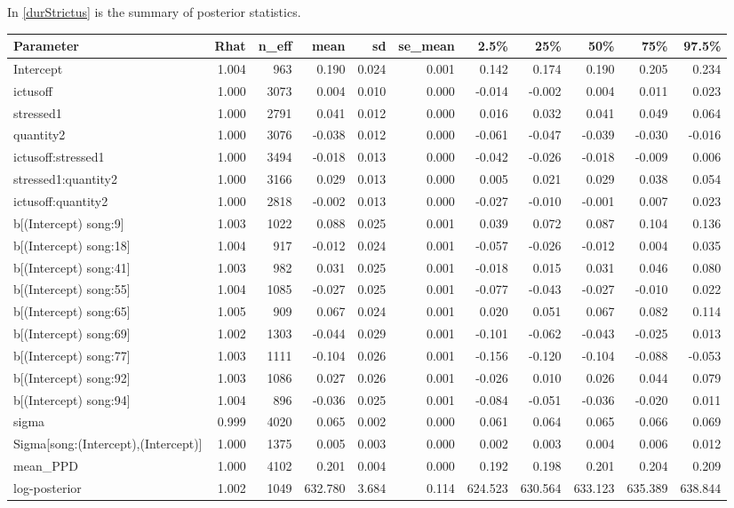 In \ref{durStrictus} is the summary of posterior statistics. 
\begin{longtable}{lrrrrrrrrrr}
  \toprule
Parameter & Rhat & n\_eff & mean & sd & se\_mean & 2.5\% & 25\% & 50\% & 75\% & 97.5\% \\ 
  \midrule
Intercept & 1.004 &  963 & 0.190 & 0.024 & 0.001 & 0.142 & 0.174 & 0.190 & 0.205 & 0.234 \\ 
  ictusoff & 1.000 & 3073 & 0.004 & 0.010 & 0.000 & -0.014 & -0.002 & 0.004 & 0.011 & 0.023 \\ 
  stressed1 & 1.000 & 2791 & 0.041 & 0.012 & 0.000 & 0.016 & 0.032 & 0.041 & 0.049 & 0.064 \\ 
  quantity2 & 1.000 & 3076 & -0.038 & 0.012 & 0.000 & -0.061 & -0.047 & -0.039 & -0.030 & -0.016 \\ 
  ictusoff:stressed1 & 1.000 & 3494 & -0.018 & 0.013 & 0.000 & -0.042 & -0.026 & -0.018 & -0.009 & 0.006 \\ 
  stressed1:quantity2 & 1.000 & 3166 & 0.029 & 0.013 & 0.000 & 0.005 & 0.021 & 0.029 & 0.038 & 0.054 \\ 
  ictusoff:quantity2 & 1.000 & 2818 & -0.002 & 0.013 & 0.000 & -0.027 & -0.010 & -0.001 & 0.007 & 0.023 \\ 
  b[(Intercept) song:9] & 1.003 & 1022 & 0.088 & 0.025 & 0.001 & 0.039 & 0.072 & 0.087 & 0.104 & 0.136 \\ 
  b[(Intercept) song:18] & 1.004 &  917 & -0.012 & 0.024 & 0.001 & -0.057 & -0.026 & -0.012 & 0.004 & 0.035 \\ 
  b[(Intercept) song:41] & 1.003 &  982 & 0.031 & 0.025 & 0.001 & -0.018 & 0.015 & 0.031 & 0.046 & 0.080 \\ 
  b[(Intercept) song:55] & 1.004 & 1085 & -0.027 & 0.025 & 0.001 & -0.077 & -0.043 & -0.027 & -0.010 & 0.022 \\ 
  b[(Intercept) song:65] & 1.005 &  909 & 0.067 & 0.024 & 0.001 & 0.020 & 0.051 & 0.067 & 0.082 & 0.114 \\ 
  b[(Intercept) song:69] & 1.002 & 1303 & -0.044 & 0.029 & 0.001 & -0.101 & -0.062 & -0.043 & -0.025 & 0.013 \\ 
  b[(Intercept) song:77] & 1.003 & 1111 & -0.104 & 0.026 & 0.001 & -0.156 & -0.120 & -0.104 & -0.088 & -0.053 \\ 
  b[(Intercept) song:92] & 1.003 & 1086 & 0.027 & 0.026 & 0.001 & -0.026 & 0.010 & 0.026 & 0.044 & 0.079 \\ 
  b[(Intercept) song:94] & 1.004 &  896 & -0.036 & 0.025 & 0.001 & -0.084 & -0.051 & -0.036 & -0.020 & 0.011 \\ 
  sigma & 0.999 & 4020 & 0.065 & 0.002 & 0.000 & 0.061 & 0.064 & 0.065 & 0.066 & 0.069 \\ 
  Sigma[song:(Intercept),(Intercept)] & 1.000 & 1375 & 0.005 & 0.003 & 0.000 & 0.002 & 0.003 & 0.004 & 0.006 & 0.012 \\ 
  mean\_PPD & 1.000 & 4102 & 0.201 & 0.004 & 0.000 & 0.192 & 0.198 & 0.201 & 0.204 & 0.209 \\ 
  log-posterior & 1.002 & 1049 & 632.780 & 3.684 & 0.114 & 624.523 & 630.564 & 633.123 & 635.389 & 638.844 \\ 
   \bottomrule


\end{longtable}
